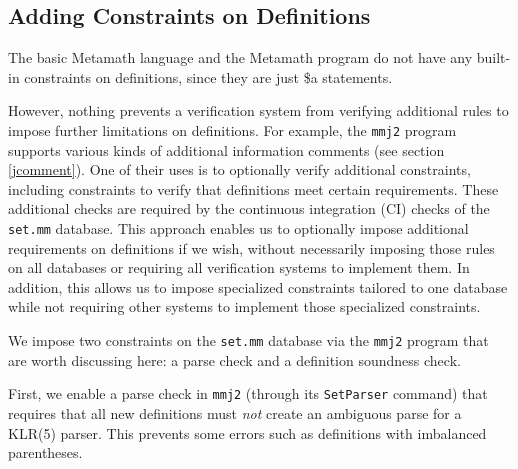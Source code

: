 \subsection{Adding Constraints on Definitions}

The basic Metamath language and the Metamath program do
not have any built-in constraints on definitions, since they are just
\$a statements.

However, nothing prevents a verification system from verifying
additional rules to impose further limitations on definitions.
For example, the \texttt{mmj2} program
supports various kinds of
additional information comments (see section \ref{jcomment}).
One of their uses is to optionally verify additional constraints,
including constraints to verify that definitions meet certain
requirements.
These additional checks are required by the
continuous integration (CI)
checks of the
\texttt{set.mm}%
database.
This approach enables us to optionally impose additional requirements
on definitions if we wish, without necessarily imposing those rules on
all databases or requiring all verification systems to implement them.
In addition, this allows us to impose specialized constraints tailored
to one database while not requiring other systems to implement
those specialized constraints.

We impose two constraints on the
\texttt{set.mm}%
 database
via the \texttt{mmj2} program that are worth discussing here:
a parse check and a definition soundness check.

%

First,
we enable a parse check in \texttt{mmj2} (through its
\texttt{SetParser} command) that requires that all new definitions
must \textit{not} create an ambiguous parse for a KLR(5) parser.
This prevents some errors such as definitions with imbalanced parentheses.

